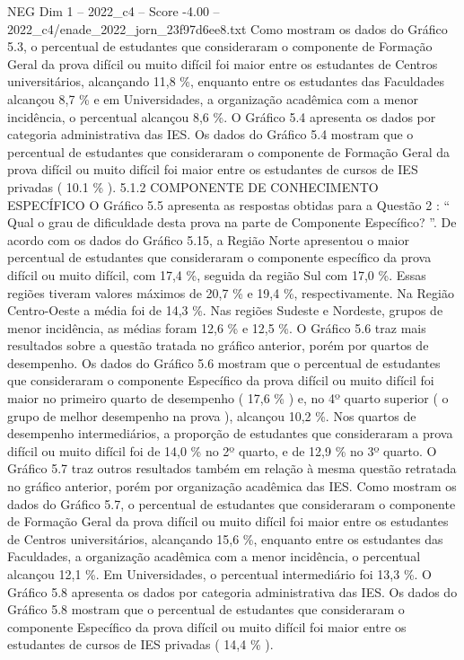 \begin{textsample}{NEG Dim 1 – 2022\_c4 – Score -4.00 – 2022\_c4/enade\_2022\_jorn\_23f97d6ee8.txt}
Como mostram os dados do Gráfico 5.3, o percentual de estudantes que consideraram o componente de Formação Geral da prova difícil ou muito difícil foi maior entre os estudantes de Centros universitários, alcançando 11,8 \%, enquanto entre os estudantes das Faculdades alcançou 8,7 \% e em Universidades, a organização acadêmica com a menor incidência, o percentual alcançou 8,6 \%.
O Gráfico 5.4 apresenta os dados por categoria administrativa das IES.
Os dados do Gráfico 5.4 mostram que o percentual de estudantes que consideraram o componente de Formação Geral da prova difícil ou muito difícil foi maior entre os estudantes de cursos de IES privadas ( 10.1 \% ). 5.1.2 COMPONENTE DE CONHECIMENTO ESPECÍFICO O Gráfico 5.5 apresenta as respostas obtidas para a Questão 2 : “ Qual o grau de dificuldade desta prova na parte de Componente Específico? ”.
De acordo com os dados do Gráfico 5.15, a Região Norte apresentou o maior percentual de estudantes que consideraram o componente específico da prova difícil ou muito difícil, com 17,4 \%, seguida da região Sul com 17,0 \%.
Essas regiões tiveram valores máximos de 20,7 \% e 19,4 \%, respectivamente.
Na Região Centro-Oeste a média foi de 14,3 \%.
Nas regiões Sudeste e Nordeste, grupos de menor incidência, as médias foram 12,6 \% e 12,5 \%.
O Gráfico 5.6 traz mais resultados sobre a questão tratada no gráfico anterior, porém por quartos de desempenho.
Os dados do Gráfico 5.6 mostram que o percentual de estudantes que consideraram o componente Específico da prova difícil ou muito difícil foi maior no primeiro quarto de desempenho ( 17,6 \% ) e, no 4º quarto superior ( o grupo de melhor desempenho na prova ), alcançou 10,2 \%.
Nos quartos de desempenho intermediários, a proporção de estudantes que consideraram a prova difícil ou muito difícil foi de 14,0 \% no 2º quarto, e de 12,9 \% no 3º quarto.
O Gráfico 5.7 traz outros resultados também em relação à mesma questão retratada no gráfico anterior, porém por organização acadêmica das IES.
Como mostram os dados do Gráfico 5.7, o percentual de estudantes que consideraram o componente de Formação Geral da prova difícil ou muito difícil foi maior entre os estudantes de Centros universitários, alcançando 15,6 \%, enquanto entre os estudantes das Faculdades, a organização acadêmica com a menor incidência, o percentual alcançou 12,1 \%.
Em Universidades, o percentual intermediário foi 13,3 \%.
O Gráfico 5.8 apresenta os dados por categoria administrativa das IES.
Os dados do Gráfico 5.8 mostram que o percentual de estudantes que consideraram o componente Específico da prova difícil ou muito difícil foi maior entre os estudantes de cursos de IES privadas ( 14,4 \% ).

\end{textsample}
